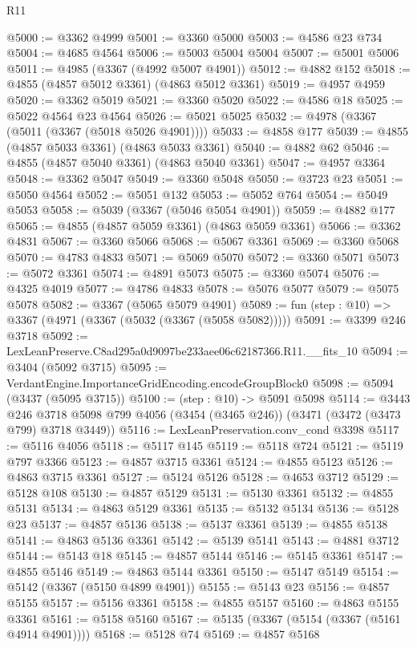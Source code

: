 \begin{lexlean}{R11}
\begin{coremodule}
@5000 := @3362 @4999
@5001 := @3360 @5000
@5003 := @4586 @23 @734
@5004 := @4685 @4564
@5006 := @5003 @5004 @5004
@5007 := @5001 @5006
@5011 := @4985 (@3367 (@4992 @5007 @4901))
@5012 := @4882 @152
@5018 := @4855 (@4857 @5012 @3361) (@4863 @5012 @3361)
@5019 := @4957 @4959
@5020 := @3362 @5019
@5021 := @3360 @5020
@5022 := @4586 @18
@5025 := @5022 @4564 @23 @4564
@5026 := @5021 @5025
@5032 := @4978 (@3367 (@5011 (@3367 (@5018 @5026 @4901))))
@5033 := @4858 @177
@5039 := @4855 (@4857 @5033 @3361) (@4863 @5033 @3361)
@5040 := @4882 @62
@5046 := @4855 (@4857 @5040 @3361) (@4863 @5040 @3361)
@5047 := @4957 @3364
@5048 := @3362 @5047
@5049 := @3360 @5048
@5050 := @3723 @23
@5051 := @5050 @4564
@5052 := @5051 @132
@5053 := @5052 @764
@5054 := @5049 @5053
@5058 := @5039 (@3367 (@5046 @5054 @4901))
@5059 := @4882 @177
@5065 := @4855 (@4857 @5059 @3361) (@4863 @5059 @3361)
@5066 := @3362 @4831
@5067 := @3360 @5066
@5068 := @5067 @3361
@5069 := @3360 @5068
@5070 := @4783 @4833
@5071 := @5069 @5070
@5072 := @3360 @5071
@5073 := @5072 @3361
@5074 := @4891 @5073
@5075 := @3360 @5074
@5076 := @4325 @4019
@5077 := @4786 @4833
@5078 := @5076 @5077
@5079 := @5075 @5078
@5082 := @3367 (@5065 @5079 @4901)
@5089 := fun (step : @10) => @3367 (@4971 (@3367 (@5032 (@3367 (@5058 @5082)))))
@5091 := @3399 @246 @3718
@5092 := LexLeanPreserve.C8ad295a0d9097be233aee06c62187366.R11.__fits_10
@5094 := @3404 (@5092 @3715)
@5095 := VerdantEngine.ImportanceGridEncoding.encodeGroupBlock0
@5098 := @5094 (@3437 (@5095 @3715))
@5100 := (step : @10) -> @5091 @5098
@5114 := @3443
    @246
    @3718
    @5098
    @799
    @4056
    (@3454 (@3465 @246))
    (@3471 (@3472 (@3473 @799) @3718 @3449))
@5116 := LexLeanPreservation.conv_cond @3398
@5117 := @5116 @4056
@5118 := @5117 @145
@5119 := @5118 @724
@5121 := @5119 @797 @3366
@5123 := @4857 @3715 @3361
@5124 := @4855 @5123
@5126 := @4863 @3715 @3361
@5127 := @5124 @5126
@5128 := @4653 @3712
@5129 := @5128 @108
@5130 := @4857 @5129
@5131 := @5130 @3361
@5132 := @4855 @5131
@5134 := @4863 @5129 @3361
@5135 := @5132 @5134
@5136 := @5128 @23
@5137 := @4857 @5136
@5138 := @5137 @3361
@5139 := @4855 @5138
@5141 := @4863 @5136 @3361
@5142 := @5139 @5141
@5143 := @4881 @3712
@5144 := @5143 @18
@5145 := @4857 @5144
@5146 := @5145 @3361
@5147 := @4855 @5146
@5149 := @4863 @5144 @3361
@5150 := @5147 @5149
@5154 := @5142 (@3367 (@5150 @4899 @4901))
@5155 := @5143 @23
@5156 := @4857 @5155
@5157 := @5156 @3361
@5158 := @4855 @5157
@5160 := @4863 @5155 @3361
@5161 := @5158 @5160
@5167 := @5135 (@3367 (@5154 (@3367 (@5161 @4914 @4901))))
@5168 := @5128 @74
@5169 := @4857 @5168

\end{coremodule}
\end{lexlean}
